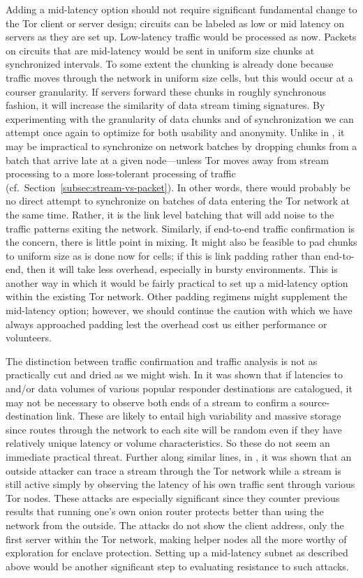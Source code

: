 \documentclass{llncs}
\begin{document}
Adding a mid-latency option should not require significant fundamental
change to the Tor client or server design; circuits can be labeled as
low or mid latency on servers as they are set up. Low-latency traffic
would be processed as now.  Packets on circuits that are mid-latency
would be sent in uniform size chunks at synchronized intervals.  To
some extent the chunking is already done because traffic moves through
the network in uniform size cells, but this would occur at a courser
granularity.  If servers forward these chunks in roughly synchronous
fashion, it will increase the similarity of data stream timing
signatures. By experimenting with the granularity of data chunks and
of synchronization we can attempt once again to optimize for both
usability and anonymity. Unlike in \cite{sync-batching}, it may be
impractical to synchronize on network batches by dropping chunks from
a batch that arrive late at a given node---unless Tor moves away from
stream processing to a more loss-tolerant processing of traffic (cf.\ 
Section~\ref{subsec:stream-vs-packet}). In other words, there would
probably be no direct attempt to synchronize on batches of data
entering the Tor network at the same time. Rather, it is the link
level batching that will add noise to the traffic patterns exiting the
network.  Similarly, if end-to-end traffic confirmation is the
concern, there is little point in mixing. It might also be feasible to
pad chunks to uniform size as is done now for cells; if this is link
padding rather than end-to-end, then it will take less overhead,
especially in bursty environments. This is another way in which it
would be fairly practical to set up a mid-latency option within the
existing Tor network. Other padding regimens might supplement the
mid-latency option; however, we should continue the caution with which
we have always approached padding lest the overhead cost us either
performance or volunteers.

The distinction between traffic confirmation and traffic analysis is
not as practically cut and dried as we might wish. In \cite{} it was
shown that if latencies to and/or data volumes of various popular
responder destinations are catalogued, it may not be necessary to
observe both ends of a stream to confirm a source-destination link.
These are likely to entail high variability and massive storage since
routes through the network to each site will be random even if they
have relatively unique latency or volume characteristics. So these do
not seem an immediate practical threat. Further along similar lines, in
\cite{attack-tor-oak05}, it was shown that an outside attacker can
trace a stream through the Tor network while a stream is still active
simply by observing the latency of his own traffic sent through
various Tor nodes. These attacks are especially significant since they
counter previous results that running one's own onion router protects
better than using the network from the outside. The attacks do not
show the client address, only the first server within the Tor network,
making helper nodes all the more worthy of exploration for enclave
protection. Setting up a mid-latency subnet as described above would
be another significant step to evaluating resistance to such attacks.
\end{document}
